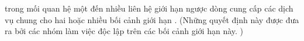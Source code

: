 
trong mối quan hệ một đến nhiều liên hệ giới hạn ngược dòng  cung cấp các dịch vụ chung cho hai hoặc nhiều bối cảnh giới hạn .
(Những quyết định này được đưa ra bởi các nhóm làm việc độc lập trên các bối cảnh giới hạn này.
)


